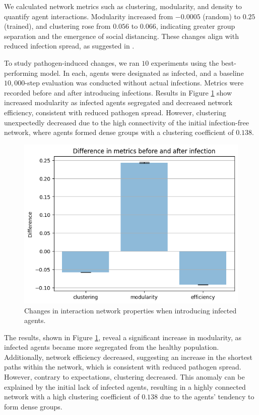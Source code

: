 \documentclass[9pt]{IEEEtran}
\begin{document}
We calculated network metrics such as clustering, modularity, and density to quantify agent interactions. Modularity increased from $-0.0005$ (random) to $0.25$ (trained), and clustering rose from $0.056$ to $0.066$, indicating greater group separation and the emergence of social distancing. These changes align with reduced infection spread, as suggested in \cite{volz2011effects}.

To study pathogen-induced changes, we ran $10$ experiments using the best-performing model. In each, agents were designated as infected, and a baseline $10,000$-step evaluation was conducted without actual infections. Metrics were recorded before and after introducing infections. Results in Figure \ref{fig:induced_changes} show increased modularity as infected agents segregated and decreased network efficiency, consistent with reduced pathogen spread. However, clustering unexpectedly decreased due to the high connectivity of the initial infection-free network, where agents formed dense groups with a clustering coefficient of $0.138$.

\begin{figure}[hbt]
    \centering
    \includegraphics[width=0.9\linewidth]{figures/induced_changes.png}
    \caption{Changes in interaction network properties when introducing infected agents.}
    \label{fig:induced_changes}
\end{figure}

The results, shown in Figure \ref{fig:induced_changes}, reveal a significant increase in modularity, as infected agents became more segregated from the healthy population. Additionally, network efficiency decreased, suggesting an increase in the shortest paths within the network, which is consistent with reduced pathogen spread. However, contrary to expectations, clustering decreased. This anomaly can be explained by the initial lack of infected agents, resulting in a highly connected network with a high clustering coefficient of $0.138$ due to the agents’ tendency to form dense groups.
\end{document}
